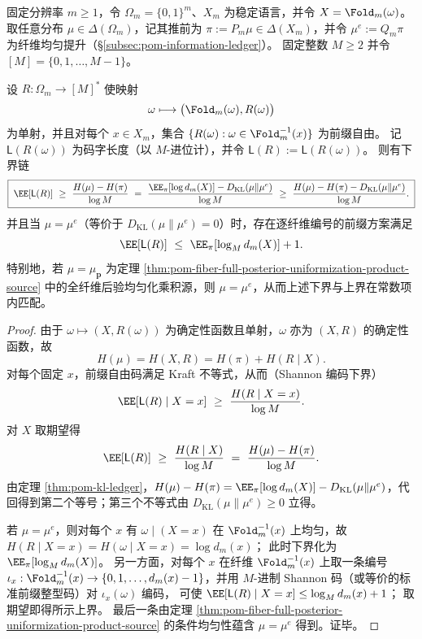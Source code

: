 \begin{theorem}[信息账本下的侧信息长度下界与等号机制]\label{thm:pom-fiber-ledger-prefix-sideinfo-length}
固定分辨率 \(m\ge 1\)，令 \(\Omega_m=\{0,1\}^m\)、\(X_m\) 为稳定语言，并令 \(X=\Fold_m(\omega)\)。
取任意分布 \(\mu\in\Delta(\Omega_m)\)，记其推前为 \(\pi:=P_m\mu\in\Delta(X_m)\)，并令 \(\mu^e:=Q_m\pi\) 为纤维均匀提升（\S\ref{subsec:pom-information-ledger}）。
固定整数 \(M\ge 2\) 并令 \([M]=\{0,1,\dots,M-1\}\)。
\par
设 \(R:\Omega_m\to[M]^{\ast}\) 使映射
\[
\omega\longmapsto \bigl(\Fold_m(\omega),R(\omega)\bigr)
\]
为单射，并且对每个 \(x\in X_m\)，集合
\(
\{R(\omega):\omega\in\Fold_m^{-1}(x)\}
\)
为前缀自由。
记 \(\mathsf L(R(\omega))\) 为码字长度（以 \(M\)-进位计），并令 \(\mathsf L(R):=\mathsf L(R(\omega))\)。
则有下界链
\[
\boxed{\;
\EE[\mathsf L(R)]
\ \ge\
\frac{H(\mu)-H(\pi)}{\log M}
\ =\
\frac{\EE_{\pi}[\log d_m(X)]-D_{\mathrm{KL}}(\mu\|\mu^e)}{\log M}
\ \ge\
\frac{H(\mu)-H(\pi)-D_{\mathrm{KL}}(\mu\|\mu^e)}{\log M}.
\;}
\]
并且当 \(\mu=\mu^e\)（等价于 \(D_{\mathrm{KL}}(\mu\|\mu^e)=0\)）时，存在逐纤维编号的前缀方案满足
\[
\EE[\mathsf L(R)]\ \le\ \EE_{\pi}[\log_M d_m(X)] + 1.
\]
特别地，若 \(\mu=\mu_{\boldsymbol p}\) 为定理 \ref{thm:pom-fiber-full-posterior-uniformization-product-source} 中的全纤维后验均匀化乘积源，则 \(\mu=\mu^e\)，从而上述下界与上界在常数项内匹配。
\end{theorem}
\begin{proof}
由于 \(\omega\mapsto(X,R(\omega))\) 为确定性函数且单射，\(\omega\) 亦为 \((X,R)\) 的确定性函数，故
\[
H(\mu)=H(X,R)=H(\pi)+H(R\mid X).
\]
对每个固定 \(x\)，前缀自由码满足 Kraft 不等式，从而（Shannon 编码下界）
\[
\EE[\mathsf L(R)\mid X=x]\ \ge\ \frac{H(R\mid X=x)}{\log M}.
\]
对 \(X\) 取期望得
\[
\EE[\mathsf L(R)]\ \ge\ \frac{H(R\mid X)}{\log M}
\ =\ \frac{H(\mu)-H(\pi)}{\log M}.
\]
由定理 \ref{thm:pom-kl-ledger}，\(H(\mu)-H(\pi)=\EE_{\pi}[\log d_m(X)]-D_{\mathrm{KL}}(\mu\|\mu^e)\)，代回得到第二个等号；第三个不等式由 \(D_{\mathrm{KL}}(\mu\|\mu^e)\ge 0\) 立得。
\par
若 \(\mu=\mu^e\)，则对每个 \(x\) 有 \(\omega\mid(X=x)\) 在 \(\Fold_m^{-1}(x)\) 上均匀，故
\(
H(R\mid X=x)=H(\omega\mid X=x)=\log d_m(x)
\)；
此时下界化为 \(\EE_{\pi}[\log_M d_m(X)]\)。
另一方面，对每个 \(x\) 在纤维 \(\Fold_m^{-1}(x)\) 上取一条编号 \(\iota_x:\Fold_m^{-1}(x)\to\{0,1,\dots,d_m(x)-1\}\)，并用 \(M\)-进制 Shannon 码（或等价的标准前缀整型码）对 \(\iota_x(\omega)\) 编码，
可使
\(
\EE[\mathsf L(R)\mid X=x]\le \log_M d_m(x)+1
\)；
取期望即得所示上界。
最后一条由定理 \ref{thm:pom-fiber-full-posterior-uniformization-product-source} 的条件均匀性蕴含 \(\mu=\mu^e\) 得到。证毕。
\end{proof}

\endinput
